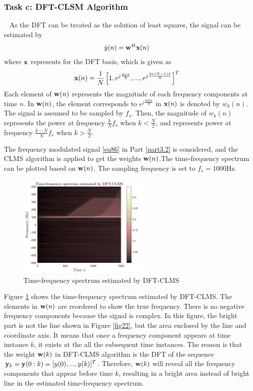 \documentclass[10pt]{article}
\begin{document}
\subsubsection{Task c: DFT-CLSM Algorithm}
\ \indent
As the DFT can be treated as the solution of least squares, the signal can be 
estimated by
\begin{equation}
	\hat{y}(n) = {\bf{w}}^H {\bf{x}}(n)
\end{equation}
where ${\bf{x}}$ represents for the DFT basis, which is given as 
\begin{equation}
	{\bf{x}}(n) = \frac{1}{N} \left[ 1, e^{j \frac{2n\pi}{N}},...,e^{j \frac{2n(N-1)\pi}{N}} \right]^T
\end{equation}
Each element of ${\bf{w}}(n)$ represents the magnitude of each frequency components at time $n$.  In ${\bf{w}}(n)$, the element 
corresponds to $e^{j \frac{2nk\pi}{N}}$ in ${\bf{x}}(n)$ is denoted by $w_k(n)$. The signal is 
assumed to be sampled by $f_s$. Then, the magnitude of $w_k(n)$ represents 
the power at frequency $\frac{k}{N} f_s$ when $k<\frac{N}{2}$, and represents 
power at frequency $\frac{k-N}{N} f_s$ when $k>\frac{N}{2}$.

The frequency modulated signal \eqref{eq86} in Part \ref{part3.2} is considered, and the 
CLMS algorithm is applied to get the weights ${\bf{w}}(n)$.The time-frequency spectrum can be 
plotted based on ${\bf{w}}(n)$. The sampling frequency is set to $f_s=1000$Hz.

\begin{figure}[htbp]
    \centering
	\includegraphics[width=0.6\textwidth]{fig/3.3_1.png}

    \caption{Time-frequency spectrum estimated by DFT-CLMS}
    \label{fig25}
\end{figure}

Figure \ref{fig25} shows the time-frequency spectrum estimated by DFT-CLMS. The 
elements in ${\bf{w}}(n)$ are reordered to show the true frequency. There is no
negative frequency components because the signal is complex.
In this figure, the bright part is not the line shown in Figure \ref{fig22}, 
but the area enclosed by the line and coordinate axis. It means that once 
a frequency component appears at time instance $k$,
it exists at the all the subsequent time instances. The reason is that the 
weight ${\bf{w}}(k)$ in DFT-CLMS algorithm is the DFT of the sequence 
${\bf{y}}_k = {\bf{y}}(0:k) = [y(0),...,y(k)]^T$. Therefore, ${\bf{w}}(k)$ will 
reveal all the frequency components that appear before time $k$, resulting in a bright
area instead of bright line in the estimated time-frequency spectrum.
\end{document}
